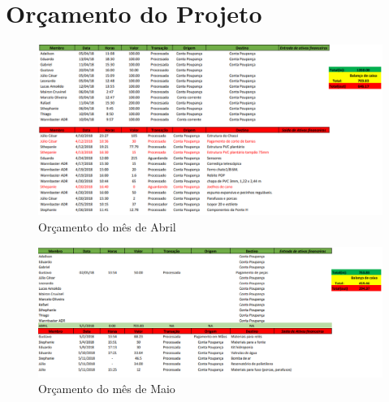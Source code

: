\chapter[Orçamento do Projeto]{Orçamento do Projeto}


\begin{figure}[H]
	\centering
	\includegraphics[width=18cm]{figuras/abril.png}
	\caption{Orçamento do mês de Abril} \label{Orçamento Abril}
\end{figure}

\begin{figure}[H]
	\centering
	\includegraphics[width=18cm]{figuras/maio.png}
	\caption{Orçamento do mês de Maio} \label{Orçamento Maio}
\end{figure}

